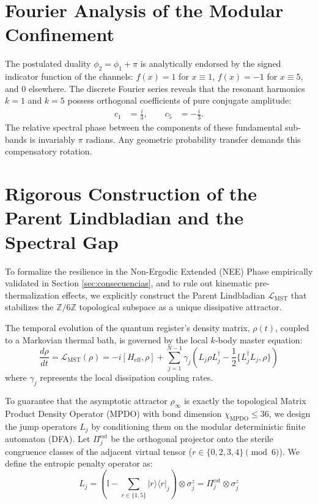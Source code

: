 \documentclass[reprint,aps,pra,superscriptaddress,nofootinbib]{revtex4-2}
\theoremstyle{plain}
\theoremstyle{definition}
\theoremstyle{remark}
\begin{document}
\section{Fourier Analysis of the Modular Confinement}
\label{app:fourier}

The postulated duality $\phi_2 = \phi_1 + \pi$ is analytically endorsed by the signed indicator function of the channels: $f(x) = 1$ for $x \equiv 1$, $f(x) = -1$ for $x \equiv 5$, and $0$ elsewhere. The discrete Fourier series reveals that the resonant harmonics $k=1$ and $k=5$ possess orthogonal coefficients of pure conjugate amplitude:
\begin{align}
c_1 &= \frac{i}{3}, \qquad c_5 &= -\frac{i}{3}.
\end{align}
The relative spectral phase between the components of these fundamental sub-bands is invariably $\pi$ radians. Any geometric probability transfer demands this compensatory rotation.

\section{Rigorous Construction of the Parent Lindbladian and the Spectral Gap}
\label{app:lindblad_construction}

To formalize the resilience in the Non-Ergodic Extended (NEE) Phase empirically validated in Section \ref{sec:consecuencias}, and to rule out kinematic pre-thermalization effects, we explicitly construct the Parent Lindbladian $\mathcal{L}_{\text{MST}}$ that stabilizes the $\mathbb{Z}/6\mathbb{Z}$ topological subspace as a unique dissipative attractor.

The temporal evolution of the quantum register's density matrix, $\rho(t)$, coupled to a Markovian thermal bath, is governed by the local $k$-body master equation:
\begin{equation}
\frac{d\rho}{dt} = \mathcal{L}_{\text{MST}}(\rho) = -i[H_{\text{eff}}, \rho] + \sum_{j=1}^{N-1} \gamma_j \left( L_j \rho L_j^\dagger - \frac{1}{2} \{ L_j^\dagger L_j, \rho \} \right)
\label{eq:app_lindblad_master}
\end{equation}
where $\gamma_j$ represents the local dissipation coupling rates.

To guarantee that the asymptotic attractor $\rho_\infty$ is exactly the topological Matrix Product Density Operator (MPDO) with bond dimension $\chi_{\text{MPDO}} \le 36$, we design the jump operators $L_j$ by conditioning them on the modular deterministic finite automaton (DFA). Let $\Pi_j^{\text{est}}$ be the orthogonal projector onto the sterile congruence classes of the adjacent virtual tensor ($r \in \{0,2,3,4\} \pmod 6$). We define the entropic penalty operator as:
\begin{equation}
L_j = \left( \mathbb{I} - \sum_{r \in \{1,5\}} |r\rangle\langle r|_j \right) \otimes \sigma_j^z = \Pi_j^{\text{est}} \otimes \sigma_j^z
\label{eq:app_jump_operators}
\end{equation}
\end{document}
